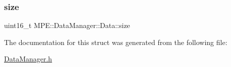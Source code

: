 \subsubsection{\texorpdfstring{size}{size}}
{\footnotesize\ttfamily uint16\+\_\+t M\+P\+E\+::\+Data\+Manager\+::\+Data\+::size}



The documentation for this struct was generated from the following file\+:\begin{DoxyCompactItemize}
\item 
\hyperlink{_data_manager_8h}{Data\+Manager.\+h}\end{DoxyCompactItemize}
